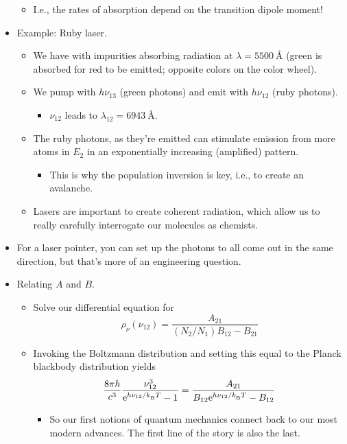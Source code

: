 \documentclass[../notes.tex]{subfiles}
\begin{document}
\begin{itemize}
\begin{equation*}
    \end{equation*}
    \begin{itemize}
        \item I.e., the rates of absorption depend on the transition dipole moment!
    \end{itemize}
    \item Example: Ruby laser.
    \begin{itemize}
        \item We have  with  impurities absorbing radiation at $\lambda=\SI{5500}{\angstrom}$ (green is absorbed for red to be emitted; opposite colors on the color wheel).
        \item We pump with $h\nu_{13}$ (green photons) and emit with $h\nu_{12}$ (ruby photons).
        \begin{itemize}
            \item $\nu_{12}$ leads to $\lambda_{12}=\SI{6943}{\angstrom}$.
        \end{itemize}
        \item The ruby photons, as they're emitted can stimulate emission from more atoms in $E_2$ in an exponentially increasing (amplified) pattern.
        \begin{itemize}
            \item This is why the population inversion is key, i.e., to create an avalanche.
        \end{itemize}
        \item Lasers are important to create coherent radiation, which allow us to really carefully interrogate our molecules as chemists.
    \end{itemize}
    \item For a laser pointer, you can set up the photons to all come out in the same direction, but that's more of an engineering question.
    \item Relating $A$ and $B$.
    \begin{itemize}
        \item Solve our differential equation for
        \begin{equation*}
            \rho_\nu(\nu_{12}) = \frac{A_{21}}{(N_2/N_1)B_{12}-B_{21}}
        \end{equation*}
        \item Invoking the Boltzmann distribution and setting this equal to the Planck blackbody distribution yields
        \begin{equation*}
            \frac{8\pi h}{c^3}\frac{\nu_{12}^3}{\e[h\nu_{12}/\kB T]-1} = \frac{A_{21}}{B_{12}\e[h\nu_{12}/\kB T]-B_{12}}
        \end{equation*}
        \begin{itemize}
            \item So our first notions of quantum mechanics connect back to our most modern advances. The first line of the story is also the last.
        \end{itemize}
    \end{itemize}
\end{itemize}
\end{document}
